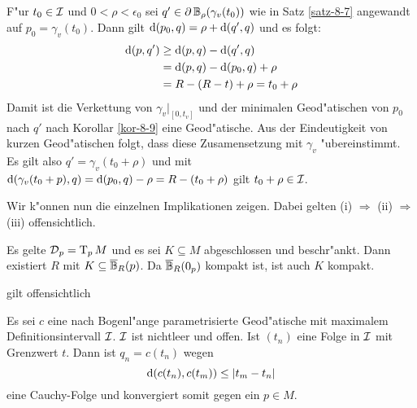 \begin{bew}
\begin{center}
\end{center}
F"ur $t_0 \in \calI$ und $0 < \rho < \epsilon_0$ sei $q' \in \partial \B_\rho(\gamma_v(t_0))$ wie in Satz \ref{satz-8-7} angewandt auf $p_0 = \gamma_v(t_0)$. Dann gilt $\dop(p_0, q) = \rho + \dop(q',q)$ und es folgt:
\begin{align*}
	\dop(p,q') &\ge \dop(p,q) - \dop (q',q)\\
	&= \dop(p,q) - \dop(p_0,q) + \rho\\
	&= R - (R - t) + \rho = t_0 + \rho
\end{align*}
Damit ist die Verkettung von $\gamma_v|_{[0,t_v]}$ und der minimalen Geod"atischen von $p_0$ nach $q'$ nach Korollar \ref{kor-8-9} eine Geod"atische. Aus der Eindeutigkeit von kurzen Geod"atischen folgt, dass diese Zusamensetzung mit $\gamma_v$ "ubereinstimmt. Es gilt also $q' = \gamma_v(t_0 + \rho)$ und mit $\dop(\gamma_v(t_0 + p), q) = \dop(p_0,q) - \rho = R - (t_0 + \rho)$ gilt $t_0 + \rho \in \calI$.

Wir k"onnen nun die einzelnen Implikationen zeigen. Dabei gelten (i) $\Rightarrow$ (ii) $\Rightarrow$ (iii) offensichtlich.
\begin{description}[font=\normalfont]
\item[(iii) $\Rightarrow$ (iv):]
	Es gelte $\calD_p = \T_pM$ und es sei $K \subseteq M$ abgeschlossen und beschr"ankt. Dann existiert $R$ mit $K \subseteq \overline\B_R(p)$. Da $\overline\B_R(0_p)$ kompakt ist, ist auch $K$ kompakt.
\item[(iv) $\Rightarrow$ (v):]
	gilt offensichtlich
\item[(v) $\Rightarrow$ (i):]
	Es sei $c$ eine nach Bogenl"ange parametrisierte Geod"atische mit maximalem Definitionsintervall $\calI$. $\calI$ ist nichtleer und offen. Ist $(t_n)$ eine Folge in $\calI$ mit Grenzwert $t$. Dann ist $q_n = c(t_n)$ wegen
		\[ \dop(c(t_n), c(t_m)) \le |t_m - t_n| \]
	eine Cauchy-Folge und konvergiert somit gegen ein $p \in M$.
	\begin{center}\begin{tikzpicture}[font=\scriptsize,scale=0.9]
		

\end{tikzpicture}
\end{center}
\end{description}
\end{bew}
